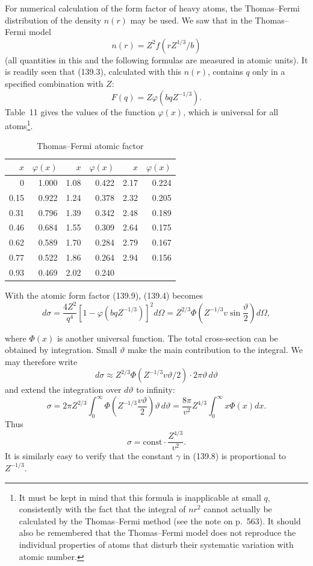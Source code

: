 For numerical calculation of the form factor of heavy atoms, the
Thomas--Fermi distribution of the density $n(r)$ may be used. We saw that in
the Thomas--Fermi model
\[
 n(r)=Z^2f(rZ^{1/3}/b)
\]
(all quantities in this and the following formulas are measured in atomic
units). It is readily seen that (139.3), calculated with this $n(r)$, contains
$q$ only in a specified combination with $Z$:
\begin{equation}
 F(q)=Z\varphi(bqZ^{-1/3}).
 \tag{139.9}
\end{equation}
Table~11 gives the values of the function $\varphi(x)$, which is universal for
all atoms\footnote{It must be kept in mind that this formula is inapplicable
at small $q$, consistently with the fact that the integral of $nr^2$ cannot
actually be calculated by the Thomas--Fermi method (see the note on p.~563).
It should also be remembered that the Thomas--Fermi model does not reproduce
the individual properties of atoms that disturb their systematic variation
with atomic number.}.

\setcounter{table}{10}
\begin{table}[htbp]
\centering
\caption{Thomas--Fermi atomic factor}
\begin{tabular}{@{}rr|rr|rr@{}}
\toprule
$x$ & $\varphi(x)$ & $x$ & $\varphi(x)$ & $x$ & $\varphi(x)$\\
\midrule
0    & 1.000 & 1.08 & 0.422 & 2.17 & 0.224\\
0.15 & 0.922 & 1.24 & 0.378 & 2.32 & 0.205\\
0.31 & 0.796 & 1.39 & 0.342 & 2.48 & 0.189\\
0.46 & 0.684 & 1.55 & 0.309 & 2.64 & 0.175\\
0.62 & 0.589 & 1.70 & 0.284 & 2.79 & 0.167\\
0.77 & 0.522 & 1.86 & 0.264 & 2.94 & 0.156\\
0.93 & 0.469 & 2.02 & 0.240 &      &      \\
\bottomrule
\end{tabular}
\end{table}

With the atomic form factor (139.9), (139.4) becomes
\begin{equation}
 d\sigma=\frac{4Z^2}{q^4}[1-\varphi(bqZ^{-1/3})]^2d\Omega
 =Z^{2/3}\Phi\left(Z^{-1/3}v\sin\frac\vartheta2\right)d\Omega,
 \tag{139.10}
\end{equation}

where $\Phi(x)$ is another universal function. The total cross-section can be
obtained by integration. Small $\vartheta$ make the main contribution to the
integral. We may therefore write
\[
 d\sigma\approx Z^{2/3}\Phi(Z^{-1/3}v\vartheta/2)\cdot2\pi\vartheta\,d\vartheta
\]
and extend the integration over $d\vartheta$ to infinity:
\[
 \sigma=2\pi Z^{2/3}\int_0^\infty\Phi\left(Z^{-1/3}\frac{v\vartheta}{2}\right)
 \vartheta\,d\vartheta
 =\frac{8\pi}{v^2}Z^{4/3}\int_0^\infty x\Phi(x)dx.
\]
Thus
\begin{equation}
 \sigma=\mathrm{const}\cdot\frac{Z^{4/3}}{v^2}.
 \tag{139.11}
\end{equation}
It is similarly easy to verify that the constant $\gamma$ in (139.8) is
proportional to $Z^{-1/3}$.

